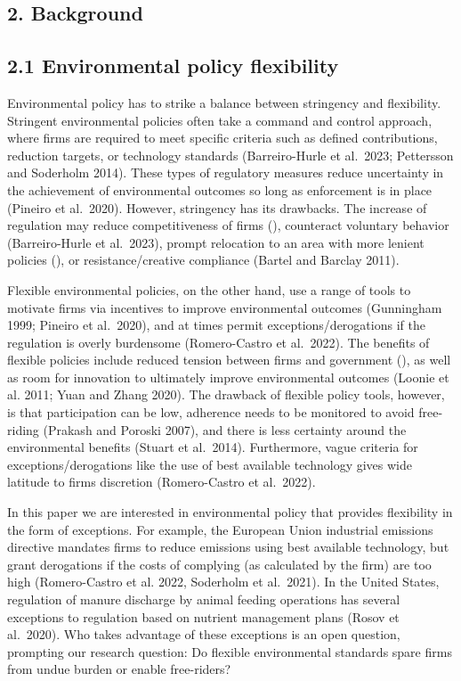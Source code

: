 \documentclass[twoside,12pt,final]{ucthesis-CA2012}
\begin{document}
\begin{ucmainmatter}
\hypertarget{background}{%
\section{2. Background}\label{background}}

\hypertarget{environmental-policy-flexibility}{%
\subsection{2.1 Environmental policy flexibility}\label{environmental-policy-flexibility}}

Environmental policy has to strike a balance between stringency and
flexibility. Stringent environmental policies often take a command and
control approach, where firms are required to meet specific criteria
such as defined contributions, reduction targets, or technology
standards (Barreiro-Hurle et al.~2023; Pettersson and Soderholm 2014).
These types of regulatory measures reduce uncertainty in the achievement
of environmental outcomes so long as enforcement is in place (Pineiro et
al.~2020). However, stringency has its drawbacks. The increase of
regulation may reduce competitiveness of firms (), counteract voluntary
behavior (Barreiro-Hurle et al.~2023), prompt relocation to an area with
more lenient policies (), or resistance/creative compliance (Bartel and
Barclay 2011).

Flexible environmental policies, on the other hand, use a range of tools
to motivate firms via incentives to improve environmental outcomes
(Gunningham 1999; Pineiro et al.~2020), and at times permit
exceptions/derogations if the regulation is overly burdensome
(Romero-Castro et al.~2022). The benefits of flexible policies include
reduced tension between firms and government (), as well as room for
innovation to ultimately improve environmental outcomes (Loonie et al.
2011; Yuan and Zhang 2020). The drawback of flexible policy tools,
however, is that participation can be low, adherence needs to be
monitored to avoid free-riding (Prakash and Poroski 2007), and there is
less certainty around the environmental benefits (Stuart et al.~2014).
Furthermore, vague criteria for exceptions/derogations like the use of
\textquotesingle best available technology\textquotesingle{} gives wide latitude to firms\textquotesingle{} discretion
(Romero-Castro et al.~2022).

In this paper we are interested in environmental policy that provides
flexibility in the form of exceptions. For example, the European Union
industrial emissions directive mandates firms to reduce emissions using
\textquotesingle best available technology\textquotesingle, but grant derogations if the costs of
complying (as calculated by the firm) are too high (Romero-Castro et al.
2022, Soderholm et al.~2021). In the United States, regulation of manure
discharge by animal feeding operations has several exceptions to
regulation based on nutrient management plans (Rosov et al.~2020). Who
takes advantage of these exceptions is an open question, prompting our
research question: Do flexible environmental standards spare firms from
undue burden or enable free-riders?


\end{ucmainmatter}
\end{document}
